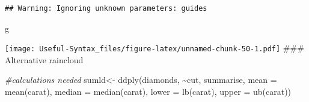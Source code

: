 \documentclass[
]{article}
\newenvironment{Shaded}{\begin{snugshade}}{\end{snugshade}}
\newcommand{\AttributeTok}[1]{\textcolor[rgb]{0.77,0.63,0.00}{#1}}
\newcommand{\CommentTok}[1]{\textcolor[rgb]{0.56,0.35,0.01}{\textit{#1}}}
\newcommand{\FunctionTok}[1]{\textcolor[rgb]{0.00,0.00,0.00}{#1}}
\newcommand{\NormalTok}[1]{#1}
\newcommand{\OtherTok}[1]{\textcolor[rgb]{0.56,0.35,0.01}{#1}}
\newcommand{\SpecialCharTok}[1]{\textcolor[rgb]{0.00,0.00,0.00}{#1}}
\begin{document}
\begin{verbatim}
## Warning: Ignoring unknown parameters: guides
\end{verbatim}

\begin{Shaded}
\begin{Highlighting}[]
\NormalTok{g}
\end{Highlighting}
\end{Shaded}

\texttt{[image: Useful-Syntax\_files/figure-latex/unnamed-chunk-50-1.pdf]}
\#\#\# Alternative raincloud

\begin{Shaded}
\begin{Highlighting}[]
\CommentTok{\#calculations needed}
\NormalTok{sumld}\OtherTok{\textless{}{-}} \FunctionTok{ddply}\NormalTok{(diamonds, }\SpecialCharTok{\textasciitilde{}}\NormalTok{cut, summarise, }\AttributeTok{mean =} \FunctionTok{mean}\NormalTok{(carat), }\AttributeTok{median =} \FunctionTok{median}\NormalTok{(carat), }\AttributeTok{lower =} \FunctionTok{lb}\NormalTok{(carat), }\AttributeTok{upper =} \FunctionTok{ub}\NormalTok{(carat))}


\end{Highlighting}
\end{Shaded}
\end{document}
